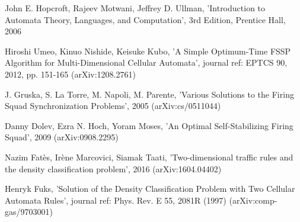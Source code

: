 John E. Hopcroft, Rajeev Motwani, Jeffrey D. Ullman, 'Introduction to Automata
Theory, Languages, and Computation', 3rd Edition, Prentice Hall, 2006

Hiroshi Umeo, Kinuo Nishide, Keisuke Kubo, 'A Simple Optimum-Time FSSP Algorithm
for Multi-Dimensional Cellular Automata', journal ref: EPTCS 90, 2012, pp.
151-165 (arXiv:1208.2761)

J. Gruska, S. La Torre, M. Napoli, M. Parente, 'Various Solutions to the Firing
Squad Synchronization Problems', 2005 (arXiv:cs/0511044)

Danny Dolev, Ezra N. Hoch, Yoram Moses, 'An Optimal Self-Stabilizing Firing
Squad', 2009 (arXiv:0908.2295)

Nazim Fatès, Irène Marcovici, Siamak Taati, 'Two-dimensional traffic rules and
the density classification problem', 2016 (arXiv:1604.04402)

Henryk Fuks, 'Solution of the Density Classification Problem with Two Cellular
Automata Rules', journal ref: Phys. Rev. E 55, 2081R (1997)
(arXiv:comp-gas/9703001)
